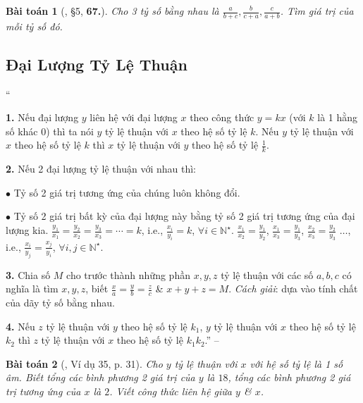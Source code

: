 \documentclass{article}
\numberwithin{equation}{section}
\newtheorem{baitoan}{Bài toán}
\begin{document}
\begin{baitoan}[\cite{Binh_Toan_7_tap_1}, \S5, \textbf{67.}]
	Cho 3 tỷ số bằng nhau là $\frac{a}{b + c},\frac{b}{c + a},\frac{c}{a + b}$. Tìm giá trị của mỗi tỷ số đó.
\end{baitoan}


\subsection{Đại Lượng Tỷ Lệ Thuận}
``\begin{enumerate*}
	\item[\textbf{1.}] Nếu đại lượng $y$ liên hệ với đại lượng $x$ theo công thức $y = kx$ (với $k$ là 1 hằng số khác $0$) thì ta nói $y$ tỷ lệ thuận với $x$ theo hệ số tỷ lệ $k$. Nếu $y$ tỷ lệ thuận với $x$ theo hệ số tỷ lệ $k$ thì $x$ tỷ lệ thuận với $y$ theo hệ số tỷ lệ $\frac{1}{k}$.
	\item[\textbf{2.}] Nếu 2 đại lượng tỷ lệ thuận với nhau thì:
	\begin{enumerate*}
		\item[$\bullet$] Tỷ số 2 giá trị tương ứng của chúng luôn không đổi.
		\item[$\bullet$] Tỷ số 2 giá trị bất kỳ của đại lượng này bằng tỷ số 2 giá trị tương ứng của đại lượng kia. $\frac{y_1}{x_1} = \frac{y_2}{x_2} = \frac{y_3}{x_3} = \cdots = k$, i.e., $\frac{x_i}{y_i} = k$, $\forall i\in\mathbb{N}^\star$. $\frac{x_1}{x_2} = \frac{y_1}{y_2}$, $\frac{x_1}{x_3} = \frac{y_1}{y_3}$, $\frac{x_2}{x_3} = \frac{y_2}{y_3}$ $\ldots$, i.e., $\frac{x_i}{y_j} = \frac{x_j}{y_i}$, $\forall i,j\in\mathbb{N}^\star$.
		\end{enumerate*}
	\item[\textbf{3.}] Chia số $M$ cho trước thành những phần $x,y,z$ tỷ lệ thuận với các số $a,b,c$ có nghĩa là tìm $x,y,z$, biết $\frac{x}{a} = \frac{y}{b} = \frac{z}{c}$ \& $x + y + z = M$. \textit{Cách giải}: dựa vào tính chất của dãy tỷ số bằng nhau.
	\item[\textbf{4.}] Nếu $z$ tỷ lệ thuận với $y$ theo hệ số tỷ lệ $k_1$, $y$ tỷ lệ thuận với $x$ theo hệ số tỷ lệ $k_2$ thì $z$ tỷ lệ thuận với $x$ theo hệ số tỷ lệ $k_1k_2$.'' -- \cite[Chap. 2, \S7, pp. 30--31]{Tuyen_Toan_7}
\end{enumerate*}

\begin{baitoan}[\cite{Tuyen_Toan_7}, Ví dụ 35, p. 31]
	Cho $y$ tỷ lệ thuận với $x$ với hệ số tỷ lệ là 1 số âm. Biết tổng các bình phương 2 giá trị của $y$ là $18$, tổng các bình phương 2 giá trị tương ứng của $x$ là $2$. Viết công thức liên hệ giữa $y$ \& $x$.
\end{baitoan}
\end{document}
